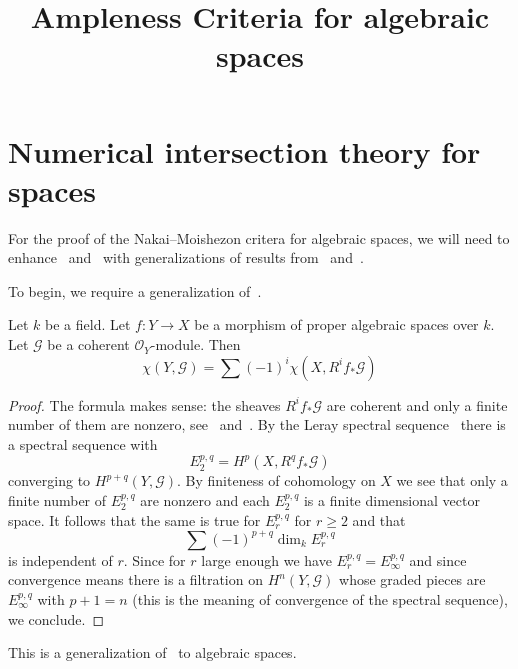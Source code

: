 


\title{Ampleness Criteria for algebraic spaces}
\maketitle

\section{Numerical intersection theory for spaces}
For the proof of the Nakai--Moishezon critera for algebraic spaces, we will
need to enhance~ and~ with generalizations of results
from~ and~.

To begin, we require a generalization of~.

\begin{lemma}
\label{lemma-euler-characteristic-morphism}
Let $k$ be a field.
Let $f : Y \to X$ be a morphism of proper algebraic spaces over $k$.
Let $\mathcal{G}$ be a coherent $\mathcal{O}_Y$-module.
Then
$$
\chi(Y, \mathcal{G}) = \sum (-1)^i \chi(X, R^if_*\mathcal{G})
$$
\end{lemma}

\begin{proof}
The formula makes sense: the sheaves $R^if_*\mathcal{G}$ are coherent
and only a finite number of them are nonzero, see~
and~.
By the Leray spectral sequence~ there is a spectral sequence with
$$
E_2^{p, q} = H^p(X, R^qf_*\mathcal{G})
$$
converging to $H^{p + q}(Y, \mathcal{G})$.
By finiteness of cohomology on $X$ we see that only a finite number of
$E_2^{p, q}$ are nonzero and each $E_2^{p, q}$ is a finite dimensional vector
space.
It follows that the same is true for $E_r^{p, q}$ for $r \geq 2$ and that
$$
\sum (-1)^{p + q} \dim_k E_r^{p, q}
$$
is independent of $r$.
Since for $r$ large enough we have $E_r^{p, q} = E_\infty^{p, q}$ and since
convergence means there is a filtration on $H^n(Y, \mathcal{G})$ whose graded
pieces are $E_\infty^{p, q}$ with $p + 1 = n$ (this is the meaning of
convergence of the spectral sequence), we conclude.
\end{proof}

This is a generalization of~ to algebraic spaces.


